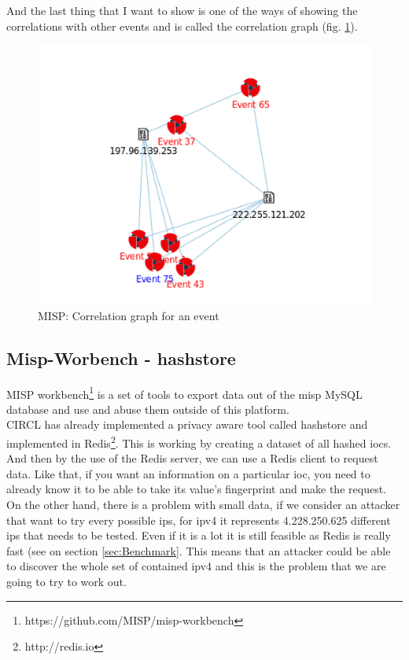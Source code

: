 \documentclass{eplmastersthesis}
\begin{document}
And the last thing that I want to show is one of the ways of showing the correlations with other events and is called the correlation graph (fig. \ref{webcorrelation}).
\begin{figure}[!h]
	\begin{center}
		\includegraphics[scale=0.35]{res/webCorrelationGraph}
		\caption{MISP: Correlation graph for an event}
		\label{webcorrelation}
	\end{center}
\end{figure}

\subsection{Misp-Worbench - hashstore}

MISP workbench\footnote{https://github.com/MISP/misp-workbench} is a set of tools to export data out of the \gls{misp} MySQL database and use and abuse them outside of this platform.\\

CIRCL has already implemented a privacy aware tool called hashstore and implemented in Redis\footnote{http://redis.io}. This is working by creating a dataset of all hashed \glspl{ioc}. And then by the use of the Redis server, we can use a Redis client to request data.
Like that, if you want an information on a particular \gls{ioc}, you need to already know it to be able to take its value's fingerprint and make the request.\\

On the other hand, there is a problem with small data, if we consider an attacker that want to try every possible \glspl{ip}, for \gls{ipv4} it represents 4.228.250.625 different \glspl{ip} that needs to be tested. Even if it is a lot it is still feasible as Redis is really fast (see on section \ref{sec:Benchmark}. This means that an attacker could be able to discover the whole set of contained \gls{ipv4} and this is the problem that we are going to try to work out.
\end{document}
